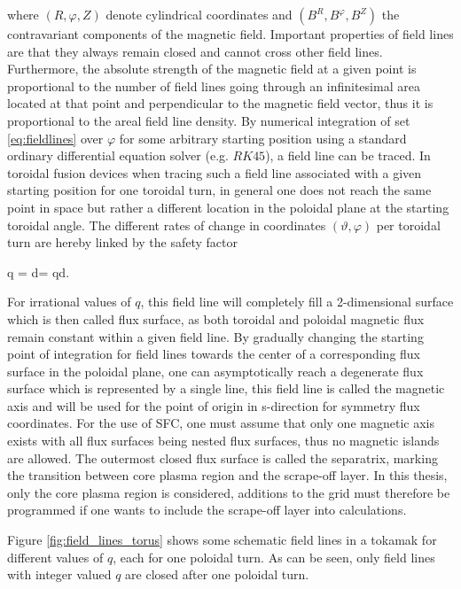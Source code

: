 \documentclass[./main.tex]{subfiles}
\begin{document}
where $(R,\varphi,Z)$ denote cylindrical coordinates and $(B^R,B^\varphi,B^Z)$ the contravariant components of the magnetic field. Important properties of field lines are that they always remain closed and cannot cross other field lines. Furthermore, the absolute strength of the magnetic field at a given point is proportional to the number of field lines going through an infinitesimal area located at that point and perpendicular to the magnetic field vector, thus it is proportional to the areal field line density.\newline
By numerical integration of set \ref{eq:fieldlines} over $\varphi$ for some arbitrary starting position using a standard ordinary differential equation solver (e.g. $RK45$), a field line can be traced.
In toroidal fusion devices when tracing such a field line associated with a given starting position for one toroidal turn, in general one does not reach the same point in space but rather a different location in the poloidal plane at the starting toroidal angle. The different rates of change in coordinates $(\vartheta,\varphi)$ per toroidal turn are hereby linked by the safety factor 

q =  \hspace{0.4cm}\hspace{0.4cm} \textrm{d}\varphi= q\textrm{d}\vartheta.
\ee

For irrational values of $q$, this field line will completely fill a 2-dimensional surface which is then called flux surface, as both toroidal and poloidal magnetic flux remain constant within a given field line. By gradually changing the starting point of integration for field lines towards the center of a corresponding flux surface in the poloidal plane, one can asymptotically reach a degenerate flux surface which is represented by a single line, this field line is called the magnetic axis and will be used for the point of origin in s-direction for symmetry flux coordinates. For the use of SFC, one must assume that only one magnetic axis exists with all flux surfaces being nested flux surfaces, thus no magnetic islands are allowed.
The outermost closed flux surface is called the separatrix, marking the transition between core plasma region and the scrape-off layer. In this thesis, only the core plasma region is considered, additions to the grid must therefore be programmed if one wants to include the scrape-off layer into calculations.

Figure \ref{fig:field_lines_torus} shows some schematic field lines in a tokamak for different values of $q$, each for one poloidal turn. As can be seen, only field lines with integer valued $q$ are closed after one poloidal turn. 
\end{document}
